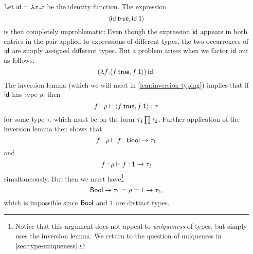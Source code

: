 Let $\expId = \expLam{x}{x}$ be the identity function. The expression
%
\begin{equation*}
    \expPair{
        \expApp{
            \expId
        }{
            \expTrue
        }
    }{
        \expApp{
            \expId
        }{
            \expUnit
        }
    }
\end{equation*}
%
is then completely unproblematic: Even though the expression $\mathsf{id}$ appears in both entries in the pair applied to expressions of different types, the two occurrences of $\mathsf{id}$ are simply assigned different types. But a problem arises when we factor $\mathsf{id}$ out as follows:
%
\begin{equation}
    \label{eq:polymorphism-example}
    \expApp{
        \expLam*{f}{
            \expPair{
                \expApp{
                    f
                }{
                    \expTrue
                }
            }{
                \expApp{
                    f
                }{
                    \expUnit
                }
            }
        }
    }{
        \expId
    }.
\end{equation}
%
The inversion lemma (which we will meet in \cref{lem:inversion-typing}) implies that if $\mathsf{id}$ has type $\rho$, then
%
\begin{equation*}
    f : \rho \vdash
    \expPair{
        \expApp{
            f
        }{
            \expTrue
        }
    }{
        \expApp{
            f
        }{
            \expUnit
        }
    }
    : \tau
\end{equation*}
%
for some type $\tau$, which must be on the form $\typeProd{\tau_1}{\tau_2}$. Further application of the inversion lemma then shows that
%
\begin{equation*}
    f : \rho \vdash
        f : \typeFunc{\typeBool}{\tau_1}
\end{equation*}
%
and
%
\begin{equation*}
    f : \rho \vdash
        f : \typeFunc{\typeUnit}{\tau_2}
\end{equation*}
%
simultaneously. But then we must have\footnote{Notice that this argument does not appeal to \emph{uniqueness} of types, but simply uses the inversion lemma. We return to the question of uniqueness in \cref{sec:type-uniqueness}.}
%
\begin{equation*}
    \typeFunc{\typeBool}{\tau_1}
        = \rho
        = \typeFunc{\typeUnit}{\tau_2},
\end{equation*}
%
which is impossible since $\mathsf{Bool}$ and $\mathsf{1}$ are distinct types.

